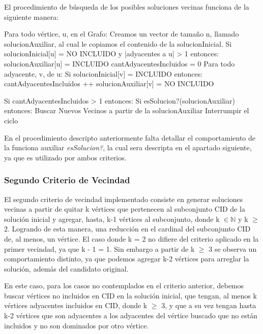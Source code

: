 El procedimiento de búsqueda de los posibles soluciones vecinas funciona de la siguiente manera:
\medskip

\begin{codesnippet}
Para todo vértice, u, en el Grafo:
  Creamos un vector de tamaño n, llamado solucionAuxiliar, al cual le copiamos
  el contenido de la solucionInicial.
  Si solucionInicial[u] = NO INCLUIDO y |adyacentes a u| > 1 entonces:
     solucionAuxiliar[u] = INCLUIDO
     cantAdyacentesIncluidos = 0
     Para todo adyacente, v, de u:
         Si solucionInicial[v] = INCLUIDO entonces:
             cantAdyacentesIncluidos ++
             solucionAuxiliar[v] = NO INCLUIDO

  Si cantAdyacentesIncluidos > 1 entonces:
     Si esSolucion?(solucionAuxiliar) entonces:
       Buscar Nuevos Vecinos a partir de la solucionAuxiliar
       Interrumpir el ciclo
\end{codesnippet}

En el procedimiento descripto anteriormente falta detallar el comportamiento de la funciona auxiliar \textit{esSolucion?}, la cual sera descripta en el apartado siguiente, ya que es utilizado por ambos criterios.

\subsubsection{Segundo Criterio de Vecindad}
El segundo criterio de vecindad implementado consiste en generar soluciones vecinas a partir de quitar k vértices que pertenecen al subconjunto CID de la solución inicial y agregar, hasta, k-1 vértices al subconjunto, donde k $\in \mathbb{N}$ y k $\geq$ 2. Logrando de esta manera, una reducción en el cardinal del subconjunto CID de, al menos, un vértice.
El caso donde k = 2 no difiere del criterio aplicado en la primer vecindad, ya que k - 1 = 1. Sin embargo a partir de k $\geq$ 3 se observa un comportamiento distinto, ya que podemos agregar k-2 vértices para arreglar la solución, además del candidato original.

En este caso, para los casos no contemplados en el criterio anterior, debemos buscar vértices no incluidos en CID en la solución inicial, que tengan, al menos k vértices adyacentes incluidos en CID, donde k $\geq$ 3, y que a su vez tengan hasta k-2 vértices que son adyacentes a los adyacentes del vértice buscado que no están incluidos y no son dominados por otro vértice.

